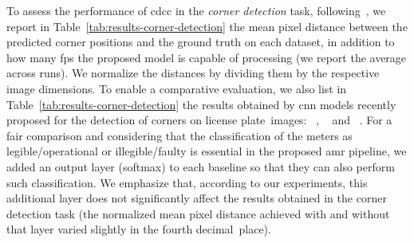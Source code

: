 To assess the performance of \gls*{cdcc} in the \textit{corner detection} task, following~\cite{yoo2020deep}, we report in Table~\ref{tab:results-corner-detection} the mean pixel distance between the predicted corner positions and the ground truth on each dataset, in addition to how many \gls*{fps} the proposed model is capable of processing (we report the average across  runs).
We normalize the distances by dividing them by the respective image dimensions.
To enable a comparative evaluation, we also list in Table~\ref{tab:results-corner-detection} the results obtained by \numbaselinescdcc \gls*{cnn} models recently proposed for the detection of corners on license plate~images: \smallerlocatenet~\cite{meng2018robust}, \locatenet~\cite{meng2018robust} and \yoohybrid~\cite{yoo2020deep}.
For a fair comparison and considering that the classification of the meters as legible/operational or illegible/faulty is essential in the proposed \gls*{amr} pipeline, we added an output layer (softmax) to each baseline so that they can also perform such classification.
We emphasize that, according to our experiments,  this additional layer does not significantly affect the results obtained in the corner detection task (the normalized mean pixel distance achieved with and without that layer varied slightly in the fourth decimal~place).

\begin{table}[!htb]
\setlength{\tabcolsep}{8pt}
\centering
\caption{\small Comparison of the corner detection results obtained by \gls*{cdcc} and \numbaselinescdcc baselines.
The proposed model presents similar accuracy to \yoohybrid but is twice as fast.
Also, it performs almost as fast as \smallerlocatenet, even though it predicts much more accurate corner~positions.}
\label{tab:results-corner-detection}

\vspace{0.5mm}

 \end{table}

